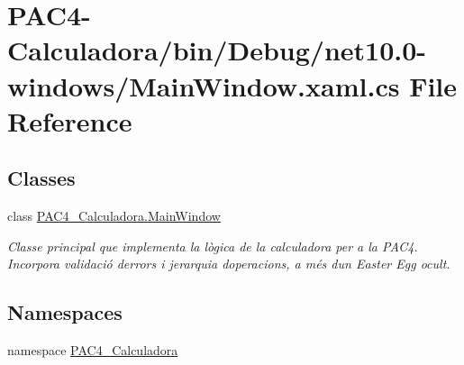 \hypertarget{bin_2_debug_2net10_80-windows_2_main_window_8xaml_8cs}{}\section{P\+A\+C4-\/\+Calculadora/bin/\+Debug/net10.0-\/windows/\+Main\+Window.xaml.\+cs File Reference}
\label{bin_2_debug_2net10_80-windows_2_main_window_8xaml_8cs}
\subsection*{Classes}
\begin{DoxyCompactItemize}
\item 
class \mbox{\hyperlink{class_p_a_c4___calculadora_1_1_main_window}{P\+A\+C4\+\_\+\+Calculadora.\+Main\+Window}}
\begin{DoxyCompactList}\small\item\em Classe principal que implementa la lògica de la calculadora per a la P\+A\+C4. Incorpora validació d\textquotesingle{}errors i jerarquia d\textquotesingle{}operacions, a més d\textquotesingle{}un Easter Egg ocult. \end{DoxyCompactList}\end{DoxyCompactItemize}
\subsection*{Namespaces}
\begin{DoxyCompactItemize}
\item 
namespace \mbox{\hyperlink{namespace_p_a_c4___calculadora}{P\+A\+C4\+\_\+\+Calculadora}}
\end{DoxyCompactItemize}

